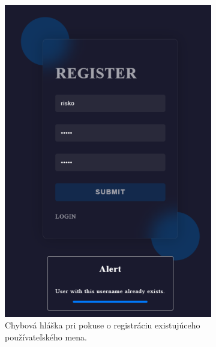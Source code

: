\begin{figure}[H]
  \centering
  \begin{subfigure}{.45\textwidth}
    \centering
    \includegraphics[width=.9\textwidth]{img/auth/username_already_exists.png}
    \caption{Chybová hláška pri pokuse o registráciu existujúceho používateľského mena.}
    \label{fig:username-already-exists}
  \end{subfigure}
  \begin{subfigure}{.45\textwidth}
    \centering

\end{subfigure}
\end{figure}
